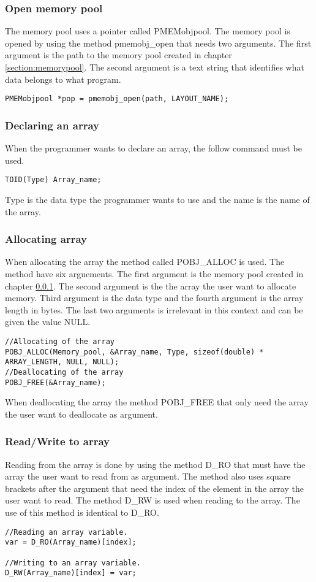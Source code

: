 \documentclass[12pt,a4paper,USenglish]{article}      %
\begin{document}
\subsubsection{Open memory pool}
\label{subsection:openmemorypool}
The memory pool uses a pointer called PMEMobjpool. The memory pool is opened by using the method pmemobj\_open that needs two arguments. The first argument is the path to the memory pool created in chapter \ref{section:memorypool}. The second argument is a text string that identifies what data belongs to what program.
\begin{lstlisting}
PMEMobjpool *pop = pmemobj_open(path, LAYOUT_NAME);
\end{lstlisting}

\subsubsection{Declaring an array}
When the programmer wants to declare an array, the follow command must be used.
\begin{lstlisting}
TOID(Type) Array_name;
\end{lstlisting}
Type is the data type the programmer wants to use and the name is the name of the array.

\subsubsection{Allocating array}
When allocating the array the method called POBJ\_ALLOC is used. The method have six arguements. The first argument is the memory pool created in chapter \ref{subsection:openmemorypool}. The second argument is the the array the user want to allocate memory. Third argument is the data type and the fourth argument is the array length in bytes. The last two arguments is irrelevant in this context and can be given the value NULL.\\
\begin{lstlisting}
//Allocating of the array
POBJ_ALLOC(Memory_pool, &Array_name, Type, sizeof(double) * ARRAY_LENGTH, NULL, NULL);
//Deallocating of the array
POBJ_FREE(&Array_name);
\end{lstlisting}
When deallocating the array the method POBJ\_FREE that only need the array the user want to deallocate as argument.

\subsubsection{Read/Write to array}
Reading from the array is done by using the method D\_RO that must have the array the user want to read from as argument. The method also uses square brackets after the argument that need the index of the element in the array the user want to read. The method D\_RW is used when reading to the array. The use of this method is identical to D\_RO.
\begin{lstlisting}
//Reading an array variable.
var = D_RO(Array_name)[index];

//Writing to an array variable.
D_RW(Array_name)[index] = var;
\end{lstlisting}
\end{document}
